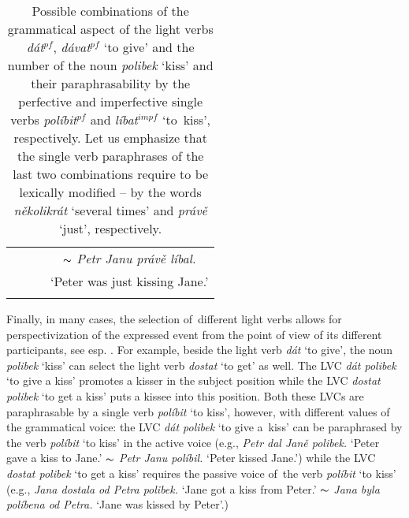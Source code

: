 \documentclass[output=paper
,modfonts
,nonflat]{langsci/langscibook}
\begin{document}
\begin{table}[tb]
\begin{tabular}{lccc}
		                            &                       &                       &   $\thicksim$ \textit{Petr Janu právě líbal.}  \\
		                            &                       &                       &    `Peter was just kissing Jane.'\\    
	\lspbottomrule       
	\end{tabular}
	\caption{Possible combinations of the grammatical aspect of the light verbs 
	\textit{dát}$^{pf}$, \textit{dávat}$^{pf}$ `to give' and the number of the 
	noun \textit{polibek} `kiss' and their paraphrasability by the perfective and 
	imperfective single verbs \textit{políbit}$^{pf}$ and \textit{líbat}$^{impf}$ 
	`to~kiss', respectively. Let us emphasize that the single verb paraphrases of 
	the last two combinations require to be lexically modified -- by the words 
	\textit{několikrát}  `several times' and \textit{právě} `just', respectively.}
	\label{aspect}
\end{table}

Finally, in many cases, the selection of~different light verbs allows for 
 perspectivization of the expressed event from the point of view of 
its different participants, see 
esp. \citet{depling-lvc-2015}. For example, beside the light verb \textit{dát} 
`to give', the noun \textit{polibek} `kiss' can select the light verb 
\textit{dostat} `to get' as well. The LVC \textit{dát polibek} `to give a kiss' 
promotes a kisser in the subject position while 
the LVC \textit{dostat polibek} `to get a kiss' puts a kissee into this position. Both these LVCs are paraphrasable by a single verb \textit{políbit} `to kiss', however, with different values of the 
grammatical voice: the LVC \textit{dát polibek} `to give a~kiss' 
can be paraphrased by the verb \textit{políbit} `to kiss' in the active voice  
(e.g., \textit{Petr dal Janě polibek.} `Peter gave a kiss to Jane.' $\thicksim$ 
\textit{Petr Janu políbil.} `Peter kissed Jane.') while the LVC \textit{dostat 
polibek} `to get a kiss' requires the passive voice of~the verb \textit{políbit} 
`to kiss' (e.g., \textit{Jana dostala od Petra polibek.} `Jane got a kiss from 
Peter.' $\thicksim$ \textit{Jana byla políbena od Petra.} `Jane was kissed by Peter'.)

\end{document}
